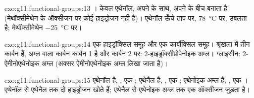 \begin{solution}{exo:g11:functional-groups:13}
। केवल एथेनॉल, अपने  के साथ, अपने  के बीच  बनाता है (मेथॉक्सीमेथेन के ऑक्सीजन पर कोई हाइड्रोजन नहीं है)।
एथेनॉल ऊँचे ताप पर, \qty{78}{\celsius} पर, उबलता है; मेथॉक्सीमेथेन
\qty{-25}{\celsius} पर।
\end{solution}

\begin{solution}{exo:g11:functional-groups:14}
एक हाइड्रॉक्सिल समूह और एक कार्बोक्सिल समूह। श्रृंखला में तीन कार्बन हैं,
अम्ल वाला कार्बन कार्बन 1 है और  कार्बन 2 पर:
2-हाइड्रॉक्सीप्रोपेनोइक अम्ल। ग्लाइसीन: 2-ऐमीनोएथेनोइक अम्ल (अक्सर
ऐमीनोएथेनोइक अम्ल लिखा जाता है)।
\end{solution}

\begin{solution}{exo:g11:functional-groups:15}
एथेनॉल  है,  , एक ; एथेनैल  है,
 , एक ; एथेनोइक अम्ल  है,  ,
एक । एथेनॉल से एथेनैल तक दो हाइड्रोजन  खोते हैं;
एथेनैल से एथेनोइक अम्ल तक एक ऑक्सीजन  जुड़ता है।
\end{solution}

